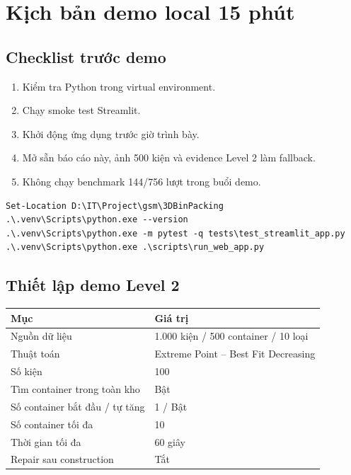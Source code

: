 \documentclass[12pt,a4paper]{article}
\begin{document}
\section{Kịch bản demo local 15 phút}

\subsection{Checklist trước demo}
\begin{enumerate}[leftmargin=1.7em]
  \item Kiểm tra Python trong virtual environment.
  \item Chạy smoke test Streamlit.
  \item Khởi động ứng dụng trước giờ trình bày.
  \item Mở sẵn báo cáo này, ảnh 500 kiện và evidence Level 2 làm fallback.
  \item Không chạy benchmark 144/756 lượt trong buổi demo.
\end{enumerate}

\begin{lstlisting}
Set-Location D:\IT\Project\gsm\3DBinPacking
.\.venv\Scripts\python.exe --version
.\.venv\Scripts\python.exe -m pytest -q tests\test_streamlit_app.py
.\.venv\Scripts\python.exe .\scripts\run_web_app.py
\end{lstlisting}

\subsection{Thiết lập demo Level 2}
\begin{table}[H]
\centering
\begin{tabularx}{\textwidth}{p{}Y}
\toprule
\textbf{Mục} & \textbf{Giá trị} \\
\midrule
Nguồn dữ liệu & 1.000 kiện / 500 container / 10 loại \\
Thuật toán & Extreme Point -- Best Fit Decreasing \\
Số kiện & 100 \\
Tìm container trong toàn kho & Bật \\
Số container bắt đầu / tự tăng & 1 / Bật \\
Số container tối đa & 10 \\
Thời gian tối đa & 60 giây \\
Repair sau construction & Tắt \\
\bottomrule
\end{tabularx}
\end{table}
\end{document}
